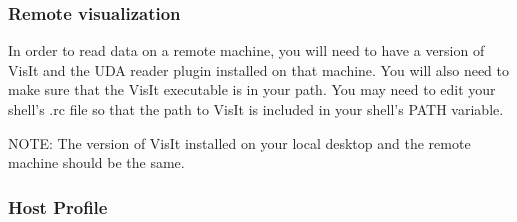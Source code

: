 \documentclass[12pt]{article}
\begin{document}







\subsubsection{Remote visualization}
In order to read data on a remote machine, you will need to have a
version of VisIt and the UDA reader plugin installed on that
machine. You will also need to make sure that the VisIt executable is
in your path. You may need to edit your shell's .rc file so that the
path to VisIt is included in your shell's PATH variable.

NOTE: The version of VisIt installed on your local desktop and the
remote machine should be the same.

\subsubsection{Host Profile}
\end{document}
